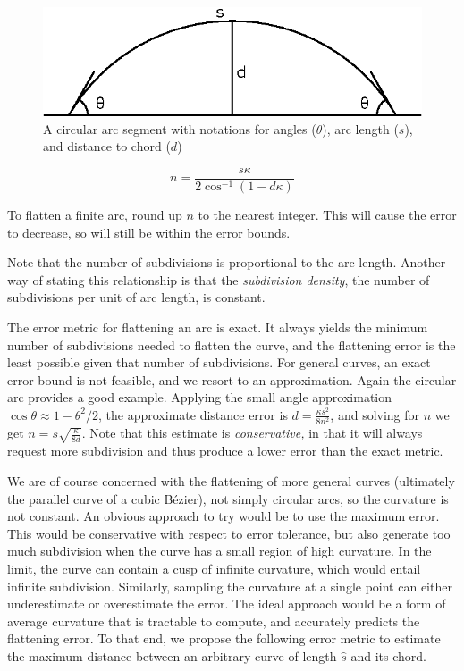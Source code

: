 \documentclass[sigconf, nonacm]{acmart}
\begin{document}
\begin{figure}
    \includegraphics[scale=0.5]{arc_chord}
    \caption{A circular arc segment with notations for angles ($\theta$), arc length ($s$), and distance to chord ($d$)}
    \label{fig:arc_chord}
\end{figure}


\[
n = \frac{s\kappa}{2\cos^{-1}\left( 1- d\kappa \right)}
\]

To flatten a finite arc, round up $n$ to the nearest integer. This will cause the error to decrease, so will still be within the error bounds.

Note that the number of subdivisions is proportional to the arc length. Another way of stating this relationship is that the \emph{subdivision density}, the number of subdivisions per unit of arc length, is constant.

The error metric for flattening an arc is exact. It always yields the minimum number of subdivisions needed to flatten the curve, and the flattening error is the least possible given that number of subdivisions. For general curves, an exact error bound is not feasible, and we resort to an approximation. Again the circular arc provides a good example. Applying the small angle approximation $\cos \theta \approx 1 - \theta^2/2$, the approximate distance error is $d = \frac{\kappa s^2}{8n^2}$, and solving for $n$ we get $n = s\sqrt{\frac{\kappa}{8d}}$. Note that this estimate is \emph{conservative,} in that it will always request more subdivision and thus produce a lower error than the exact metric.

We are of course concerned with the flattening of more general curves (ultimately the parallel curve of a cubic Bézier), not simply circular arcs, so the curvature is not constant. An obvious approach to try would be to use the maximum error. This would be conservative with respect to error tolerance, but also generate too much subdivision when the curve has a small region of high curvature. In the limit, the curve can contain a cusp of infinite curvature, which would entail infinite subdivision. Similarly, sampling the curvature at a single point can either underestimate or overestimate the error. The ideal approach would be a form of average curvature that is tractable to compute, and accurately predicts the flattening error. To that end, we propose the following error metric to estimate the maximum distance between an arbitrary curve of length $\hat{s}$ and its chord.
\end{document}
